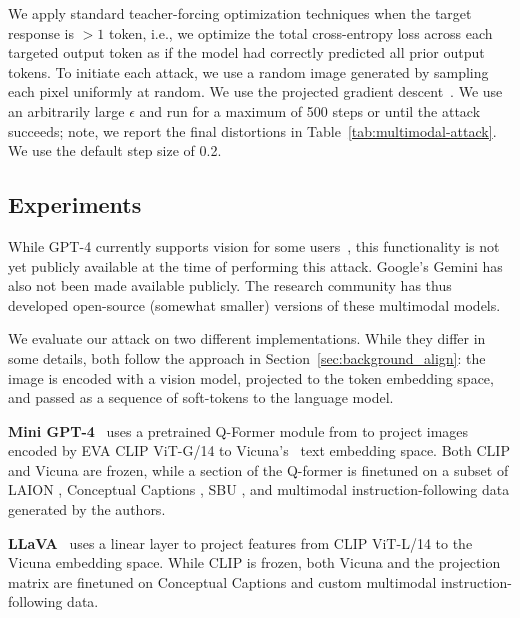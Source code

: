 \documentclass{article}
\renewcommand{\cite}{\citep}
\begin{document}
We apply standard teacher-forcing optimization techniques when the target response is $>1$ token, i.e., we optimize the total cross-entropy loss across each targeted output token as if the model had correctly predicted all prior output tokens.
To initiate each attack, we use a random image generated by sampling each pixel uniformly at random.  We use the projected gradient descent~\cite{madry2017towards}. We use an arbitrarily large $\epsilon$ and run for a maximum of 500 steps or until the attack succeeds; note, we report the final distortions in Table~\ref{tab:multimodal-attack}. We use the default step size of 0.2.


\subsection{Experiments}

While GPT-4 currently supports vision for some users~\cite{gpt4},
this functionality is not yet publicly available at the time of performing this attack.
%
Google's Gemini has also not been made available publicly.
%
The research community has thus developed open-source
(somewhat smaller) versions of these multimodal models.

We evaluate our attack on two different implementations.
%
While they differ in some details, both follow the approach
in Section~\ref{sec:background_align}: the image is encoded with a vision model,
projected to the token embedding space, and passed as a sequence
of soft-tokens to the language model.
%

\textbf{Mini GPT-4}~\citep{minigpt4} uses a pretrained Q-Former module from \cite{li2023blip} to project images encoded by EVA CLIP ViT-G/14 \cite{fang2022eva} to Vicuna's~\citep{vicuna2023} text embedding space. Both CLIP and Vicuna are frozen, while a section of the Q-former is finetuned on a subset of LAION \cite{laion}, Conceptual Captions \cite{cc3m}, SBU \cite{sbu}, and multimodal instruction-following data generated by the authors.


\textbf{LLaVA}~\citep{llava} uses a linear layer to project features from CLIP ViT-L/14 to the Vicuna embedding space. While CLIP is frozen, both Vicuna and the projection matrix are finetuned on Conceptual Captions \cite{cc3m} and custom multimodal instruction-following data.
\end{document}
